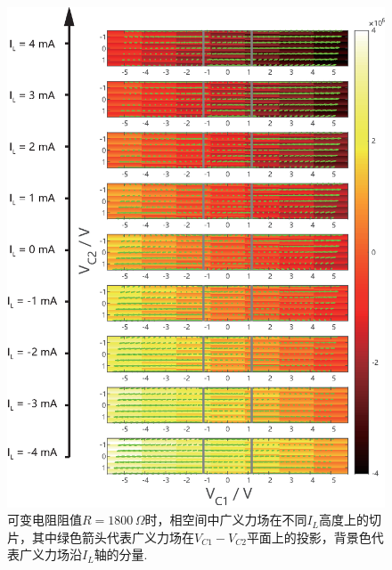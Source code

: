 \documentclass[a4paper, 10pt]{article}
\begin{document}
\begin{appendix}
\begin{figure}[H]
    \centering
    \includegraphics[width=\columnwidth]{Generalized-force-map-R=1800-modified.eps}
    \caption{可变电阻阻值$R=1800\,\Omega$时，相空间中广义力场在不同$I_L$高度上的切片，其中绿色箭头代表广义力场在$V_{C1}-V_{C2}$平面上的投影，背景色代表广义力场沿$I_L$轴的分量.}
    \label{Generalized-force-map-R=1800}
\end{figure}


\end{appendix}
\end{document}

